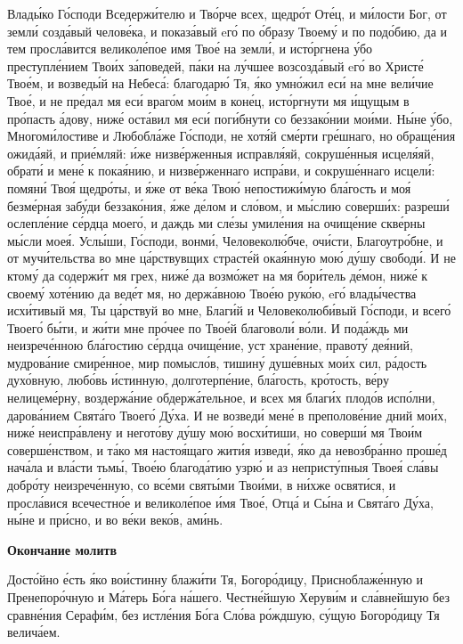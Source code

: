    Влады́ко Го́споди Вседержи́телю и Тво́рче всех, щедро́т Оте́ц, и
ми́лости Бог, от земли́ созда́вый челове́ка, и показа́вый eго́ по о́бразу
Твоему́ и по подо́бию, да и тем просла́вится великоле́пое имя Твое́ на
земли́, и исто́ргнена у́бо преступле́нием Твои́х за́поведей, па́ки на
лу́чшее возсозда́вый eго́ во Христе́ Твое́м, и возведы́й на Небеса́:
благодарю́ Тя, я́ко умно́жил еси́ на мне вели́чие Твое́, и не пре́дал
мя еси́ враго́м мои́м в коне́ц, исто́ргнути мя и́щущым в про́пасть
а́дову, ниже́ оста́вил мя еси́ поги́бнути со беззако́нии мои́ми. Ны́не у́бо,
Многоми́лостиве и Любобла́же Го́споди, не хотя́й сме́рти гре́шнаго, но
обраще́ния ожида́яй, и прие́мляй: и́же низве́рженныя исправля́яй,
сокруше́нныя исцеля́яй, обрати́ и мене́ к покая́нию, и низве́рженнаго
испра́ви, и сокруше́ннаго исцели́: помяни́ Твоя́ щедро́ты, и я́же от ве́ка Твою́
непостижи́мую бла́гость и моя́ безме́рная забу́ди беззако́ния, я́же
де́лом и сло́вом, и мы́слию соверши́х: разреши́ ослепле́ние се́рдца
моего́, и даждь ми сле́зы умиле́ния на очище́ние скве́рны мы́сли моея́.
Услы́ши, Го́споди, вонми́, Человеколю́бче, очи́сти, Благоутро́бне, и
от мучи́тельства во мне ца́рствувщих страсте́й окая́нную мою́ ду́шу
свободи́. И не ктому́ да содержи́т мя грех, ниже́ да возмо́жет на мя
бори́тель де́мон, ниже́ к своему́ хоте́нию да веде́т мя, но держа́вною
Твое́ю руко́ю, eго́ влады́чества исхи́тивый мя, Ты ца́рствуй во мне,
Благи́й и Человеколюби́вый Го́споди, и всего́ Твоего́ бы́ти, и жи́ти
мне про́чее по Твое́й благоволи́ во́ли. И пода́ждь ми неизрече́нною
бла́гостию се́рдца очище́ние, уст хране́ние, правоту́ дея́ний, мудрова́ние
смире́нное, мир помысло́в, тишину́ душе́вных мои́х сил, ра́дость духо́вную,
любо́вь и́стинную, долготерпе́ние, бла́гость, кро́тость, ве́ру нелицеме́рну,
воздержа́ние обдержа́тельное, и всех мя благи́х плодо́в испо́лни, дарова́нием
Свята́го Твоего́ Ду́ха. И не возведи́ мене́ в преполове́ние дний мои́х,
ниже́ неиспра́влену и негото́ву ду́шу мою́ восхи́тиши, но соверши́ мя
Твои́м соверше́нством, и та́ко мя настоя́щаго жити́я изведи́, я́ко да
невозбра́нно проше́д нача́ла и вла́сти тьмы́, Твое́ю благода́тию узрю́ и аз
непристу́пныя Твоея́ сла́вы добро́ту неизрече́нную, со все́ми святы́ми
Твои́ми, в ни́хже освяти́ся, и просла́вися всечестно́е и великоле́пое и́мя
Твое́, Отца́ и Сы́на и Свята́го Ду́ха, ны́не и при́сно, и во ве́ки веко́в,
ами́нь.




 

\bfseries Окончание молитв\normalfont{}


   Досто́йно е́сть я́ко вои́стинну блажи́ти Тя, Богоро́дицу, Присноблаже́нную и
Пренепоро́чную и Ма́терь Бо́га на́шего. Честне́йшую Херуви́м и сла́внейшую
без сравне́ния Серафи́м, без истле́ния Бо́га Сло́ва ро́ждшую, су́щую
Богоро́дицу Тя велича́ем.


